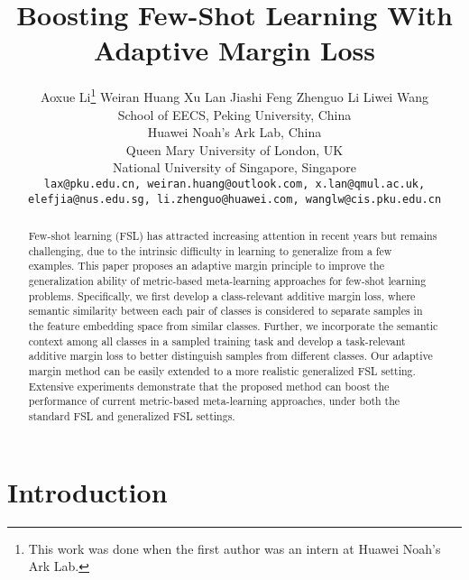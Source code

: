 \documentclass[10pt,twocolumn,letterpaper]{article}
\begin{document}
\title{Boosting Few-Shot Learning With Adaptive Margin Loss}

\author{Aoxue Li\thanks{This work was done when the first author was an intern at Huawei Noah's Ark Lab.} \quad Weiran Huang \quad Xu Lan \quad Jiashi Feng \quad Zhenguo Li \quad Liwei Wang\vspace{0.5em}\\
  School of EECS, Peking University, China\\
  Huawei Noah's Ark Lab, China\\
  Queen Mary University of London, UK\\
  National University of Singapore, Singapore\\
  {\tt\small lax@pku.edu.cn, weiran.huang@outlook.com, x.lan@qmul.ac.uk,}\\ {\tt\small elefjia@nus.edu.sg, li.zhenguo@huawei.com, wanglw@cis.pku.edu.cn}
}


\maketitle
\thispagestyle{empty}

\begin{abstract}
Few-shot learning (FSL) has attracted increasing attention in recent years but remains challenging, due to the intrinsic difficulty in learning to generalize from a few examples. This paper proposes an adaptive margin principle to improve the generalization ability of metric-based meta-learning approaches for few-shot learning problems. Specifically, we first develop a class-relevant additive margin loss, where semantic similarity between each pair of classes is considered to separate samples in the feature embedding space from similar classes. Further, we incorporate the semantic context among all classes in a sampled training task and develop a task-relevant additive margin loss to better distinguish samples from different classes. Our adaptive margin method can be easily extended to a more realistic generalized FSL setting. Extensive experiments demonstrate that the proposed method can boost the performance of current metric-based meta-learning approaches, under both the standard FSL and generalized FSL settings.
\end{abstract}

\section{Introduction}
\end{document}
